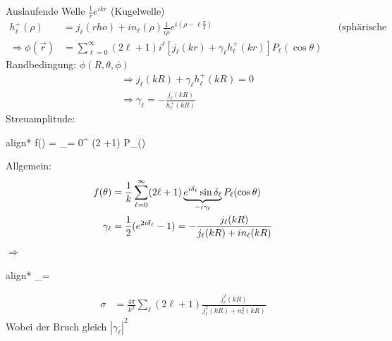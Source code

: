 	Auslaufende Welle $ %
	\frac{1}{r} e^{ikr}$ (Kugelwelle)
		\begin{align*}
			h_\ell^+ (\rho) &= j_\ell (rho) + in_\ell(\rho) %
			\frac{1}{i\rho} e^{i(\rho-\ell\frac{\pi}{2})} &
			&\text{(sphärische Hantelfunktion 1ter Art)} \\
			\Rightarrow \phi (\vec{r}) &= \sum_{\ell=0}^{\infty} (2 \ell +1) i^\ell
			\left[ j_\ell (kr) +\gamma_\ell h^+_\ell (kr)
			\right] P_\ell (\cos \theta)
		\end{align*}
	Randbedingung: $\phi (R, \theta, \phi)$
		\begin{align*}
			&\Rightarrow j_\ell (kR) + \gamma_\ell h_\ell^+(kR) = 0\\
			&\Rightarrow \gamma_\ell = -\frac{j_\ell(kR)}{h_\ell^+ (kR)}
		\end{align*}
	Streuamplitude:
		\begin{empheq}[box=\boxed]{align*}
			f(\theta) = \sum_{\ell = 0}^{\infty} (2 \ell +1)  P_\ell(\cos \theta)
		\end{empheq}
	Allgemein:
		\begin{align*}
			f(\theta) &= \frac{1}{k} \sum_{\ell = 0}^{\infty}
			(2 \ell + 1) \underbrace{e^{i\delta_\ell} \sin \delta_\ell}_{\mathclap{-i \gamma_\ell}}
			P_\ell (\cos \theta) \\
			\gamma_\ell &= \frac{1}{2} (e^{2i\delta_\ell} - 1)
			= -\frac{j_\ell(kR)}{j_\ell(kR)+ in_\ell (kR)}
		\end{align*}
		$\Rightarrow$
		\begin{empheq}[box=\boxed]{align*}
			\tan \delta_\ell = \frac{j_\ell (kR)}{n_\ell (kR)}
		\end{empheq}
		\begin{align*}
			\sigma &= \frac{4 \pi}{k^2} \sum_{\ell} (2\ell +1) 
			\frac{j_\ell^2 (kR)}{j_\ell^2 (kR)+ n_\ell^2 (kR)}
		\end{align*}
	Wobei der Bruch gleich $|\gamma_\ell|^2$
	
